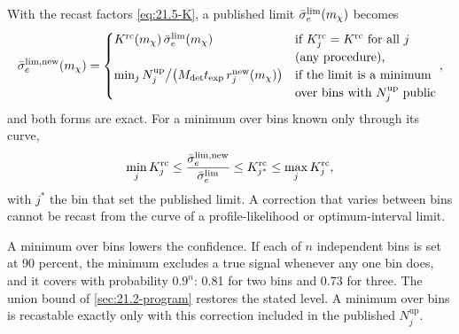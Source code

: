 \begin{keyresult}
With the recast factors \cref{eq:21.5-K}, a published limit $\bar{\sigma}_{e}^{\mathrm{lim}}(m_{\chi})$ becomes
\begin{equation}
  \sigmae^{\mathrm{lim,new}}(\mchi) =
  \begin{cases}
    K^{\mathrm{rc}}(\mchi)\,\sigmae^{\mathrm{lim}}(\mchi) & \begin{tabular}[t]{@{}l@{}}if $K^{\mathrm{rc}}_j = K^{\mathrm{rc}}$ for all $j$\\(any procedure),\end{tabular}\\[2pt]
    \min_j N_j^{\mathrm{up}}\big/\bigl(M_{\mathrm{det}}t_{\mathrm{exp}}\,r_j^{\mathrm{new}}(\mchi)\bigr) & \begin{tabular}[t]{@{}l@{}}if the limit is a minimum\\over bins with $N_j^{\mathrm{up}}$ public\end{tabular}
  \end{cases} ,
  \label{eq:21.5-recast}
\end{equation}
and both forms are exact. For a minimum over bins known only through its curve,
\begin{equation}
  \min_jK^{\mathrm{rc}}_j \le \frac{\bar{\sigma}_{e}^{\mathrm{lim,new}}}{\bar{\sigma}_{e}^{\mathrm{lim}}} \le K^{\mathrm{rc}}_{j^*} \le \max_jK^{\mathrm{rc}}_j ,
  \label{eq:21.5-bracket}
\end{equation}
with $j^*$ the bin that set the published limit. A correction that varies between bins cannot be recast from the curve of a profile-likelihood or optimum-interval limit.
\end{keyresult}

A minimum over bins lowers the confidence. If each of $n$ independent bins is set at 90 percent, the minimum excludes a true signal whenever any one bin does, and it covers with probability $0.9^n$: 0.81 for two bins and 0.73 for three. The union bound of \cref{sec:21.2-program} restores the stated level. A minimum over bins is recastable exactly only with this correction included in the published $N_j^{\mathrm{up}}$.

